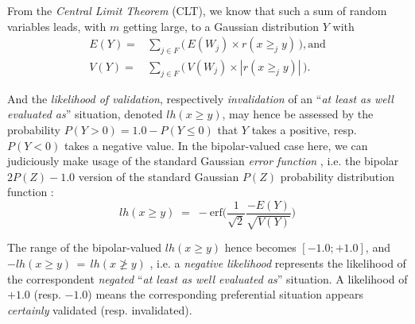 From the \emph{Central Limit Theorem} (CLT), we know that such a sum of random variables leads, with $m$ getting large, to a Gaussian distribution $Y$ with
\begin{eqnarray}
E(Y ) = &\sum_{j \in F} \big(\,E(W_j) \times r(x \geqslant_j y)\,\big), \text{and}\\
V(Y) = &\sum_{j \in F} \big(\,V(W_j)\times |r(x \geqslant_j y)|\,\big).
\end{eqnarray}

And the \emph{likelihood of validation}, respectively \emph{invalidation} of an ``\emph{at least as well evaluated as}'' situation, denoted $lh(x \geqslant y)$,  may hence be assessed by the probability $P(Y > 0) = 1.0 - P(Y \leqslant 0)$ that $Y$ takes a positive, resp. $P(Y < 0)$ takes a negative value. In the bipolar-valued case here, we can judiciously make usage of the standard Gaussian \emph{error function} , i.e. the bipolar $2P(Z) - 1.0$ version of the standard Gaussian $P(Z)$ probability distribution function \citep{NR3-2007-6}:
\begin{equation}
  lh(x \geqslant y) \;=\; -\text{erf}\big(\frac{1}{\sqrt{2}}\frac{-E(Y)}{\sqrt{V(Y)}} \big)
\end{equation}

The range of the bipolar-valued $lh(x \geqslant y)$ hence becomes $[-1.0;+1.0]$, and $-lh(x \geqslant y) \,=\, lh(x \not\geqslant y)$ , i.e. a \emph{negative likelihood} represents the likelihood of the correspondent \emph{negated} ``\emph{at least as well evaluated as}'' situation. A likelihood of $+1.0$ (resp. $-1.0$) means the corresponding preferential situation appears \emph{certainly} validated (resp. invalidated).

